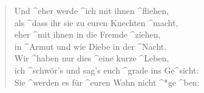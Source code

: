 \documentclass{leadsheet}
\begin{document}
\begin{song}
\begin{multicols}{2}
  \begin{verse}
    Und ^eher werde ^ich mit ihnen ^fliehen, \\
    als ^dass ihr sie zu euren Knechten ^macht, \\
    eher ^mit ihnen in die Fremde ^ziehen, \\
    in ^Armut und wie Diebe in der ^Nacht. \\
    Wir ^haben nur dies ^eine kurze ^Leben, \\
    ich ^schwör's und sag's euch ^grade ins Ge^sicht: \\
    Sie ^werden es für ^euren Wahn nicht ^*ge ^ben:
  \end{verse}
  \begin{chorus}[after-label=]\end{chorus}
  \end{multicols}
\end{song}
\end{document}
